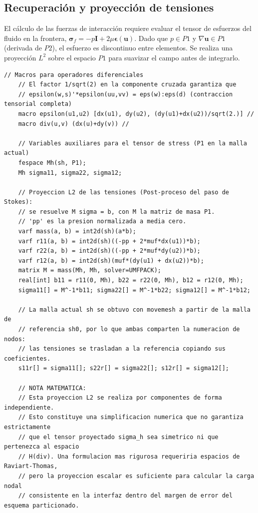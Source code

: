 \documentclass[12pt, letterpaper]{report}
\theoremstyle{definition}
\begin{document}
\subsection{Recuperación y proyección de tensiones}
\label{subsec:proyeccion_tensiones}

El cálculo de las fuerzas de interacción requiere evaluar el tensor de esfuerzos del fluido en la frontera, $\boldsymbol{\sigma}_f = -p\mathbf{I} + 2\mu \boldsymbol{\epsilon}(\mathbf{u})$. Dado que $p \in P1$ y $\nabla \mathbf{u} \in P1$ (derivada de $P2$), el esfuerzo es discontinuo entre elementos. Se realiza una proyección $L^2$ sobre el espacio $P1$ para suavizar el campo antes de integrarlo.

\begin{lstlisting}[caption={Cálculo variacional del tensor de esfuerzos hidrodinámicos}]
    // Macros para operadores diferenciales
    // El factor 1/sqrt(2) en la componente cruzada garantiza que
    // epsilon(w,s)'*epsilon(uu,vv) = eps(w):eps(d) (contraccion tensorial completa)
    macro epsilon(u1,u2) [dx(u1), dy(u2), (dy(u1)+dx(u2))/sqrt(2.)] //
    macro div(u,v) (dx(u)+dy(v)) //
    
    // Variables auxiliares para el tensor de stress (P1 en la malla actual)
    fespace Mh(sh, P1);
    Mh sigma11, sigma22, sigma12;

    // Proyeccion L2 de las tensiones (Post-proceso del paso de Stokes):
    // se resuelve M sigma = b, con M la matriz de masa P1.
    // 'pp' es la presion normalizada a media cero.
    varf mass(a, b) = int2d(sh)(a*b);
    varf r11(a, b) = int2d(sh)((-pp + 2*muf*dx(u1))*b);
    varf r22(a, b) = int2d(sh)((-pp + 2*muf*dy(u2))*b);
    varf r12(a, b) = int2d(sh)(muf*(dy(u1) + dx(u2))*b);
    matrix M = mass(Mh, Mh, solver=UMFPACK);
    real[int] b11 = r11(0, Mh), b22 = r22(0, Mh), b12 = r12(0, Mh);
    sigma11[] = M^-1*b11; sigma22[] = M^-1*b22; sigma12[] = M^-1*b12;

    // La malla actual sh se obtuvo con movemesh a partir de la malla de
    // referencia sh0, por lo que ambas comparten la numeracion de nodos:
    // las tensiones se trasladan a la referencia copiando sus coeficientes.
    s11r[] = sigma11[]; s22r[] = sigma22[]; s12r[] = sigma12[];

    // NOTA MATEMATICA: 
    // Esta proyeccion L2 se realiza por componentes de forma independiente.
    // Esto constituye una simplificacion numerica que no garantiza estrictamente 
    // que el tensor proyectado sigma_h sea simetrico ni que pertenezca al espacio 
    // H(div). Una formulacion mas rigurosa requeriria espacios de Raviart-Thomas, 
    // pero la proyeccion escalar es suficiente para calcular la carga nodal 
    // consistente en la interfaz dentro del margen de error del esquema particionado.
\end{lstlisting}
\end{document}

